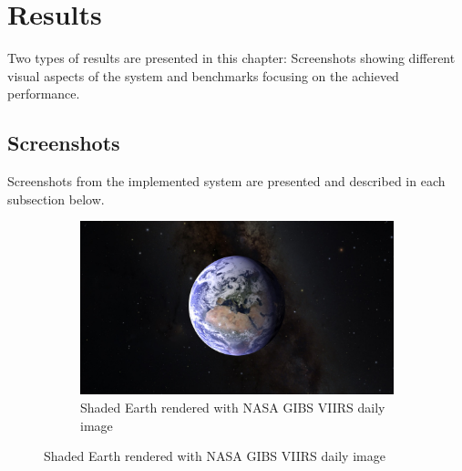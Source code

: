 \chapter{Results}
\label{chapter:results}
Two types of results are presented in this chapter: Screenshots showing different visual aspects of the system and benchmarks focusing on the achieved performance.

\section{Screenshots}
Screenshots from the implemented system are presented and described in each subsection below. 

\begin{figure}[h]
  \centering
  \begin{subfigure}[bt]{0.9\textwidth}
    \includegraphics[width=\textwidth]{figures/results/screenshots/specular_earth.jpg}
    \caption{Shaded Earth rendered with NASA GIBS VIIRS daily image \cite{gibs}}
  \end{subfigure}
\end{figure}

\clearpage
